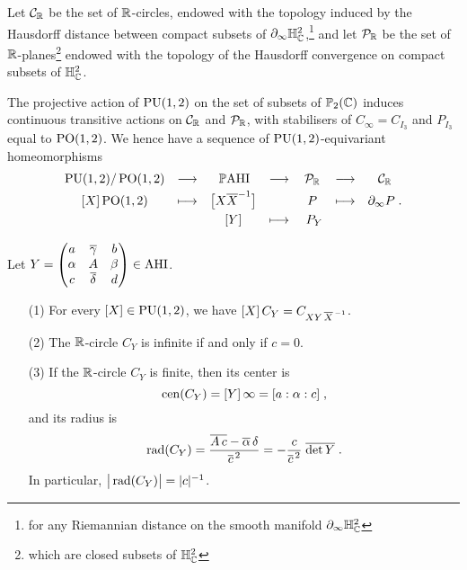 \documentclass[11pt]{article}
\begin{document}
\newcommand\rcircles{\C_\RR}
\newcommand\rplanes{\P_\RR}

\medskip
Let $\rcircles$ be the set of ${\mathbb R}$-circles, endowed with the topology
induced by the Hausdorff distance between compact subsets of
$\partial_\infty{\mathbb H}^2_{\mathbb C}$,\footnote{for any Riemannian distance on
  the smooth manifold $\partial_\infty{\mathbb H}^2_{\mathbb C}$} and let $\rplanes$
be the set of ${\mathbb R}$-planes\footnote{which are closed subsets of
  ${\mathbb H}^2_{\mathbb C}$} endowed with the topology of the Hausdorff convergence
on compact subsets of ${\mathbb H}^2_{\mathbb C}$.


The projective action of $\operatorname{PU}(1,2)$ on the set of subsets of
${\mathbb P}_2({\mathbb C})$ induces continuous transitive actions on $\rcircles$ and
$\rplanes$, with stabilisers of $C_\infty=C_{I_3}$ and $P_{I_3}$ equal
to $\operatorname{PO}(1,2)$.  We hence have a sequence of $\operatorname{PU}(1,2)$-equivariant
homeomorphisms
\begin{equation}\label{eq:homeospaceRcercle}
\begin{array}{ccccccc}
\vspace{.1cm} 
\PU(1,2)/\PO(1,2) & \longrightarrow & \phahi & \longrightarrow & 
\rplanes & \longrightarrow & \rcircles\\
\vspace{.1cm} 
{}[X]\PO(1,2) &\longmapsto & \big[X\ov{X}^{-1}\big]& & P &\longmapsto &
\partial_\infty P \;.\\ & & [Y]&\longmapsto & \ P_Y & &
\end{array}
\end{equation}


\blemm \label{lem:calccentrerayon}
Let $Y=\begin{pmatrix} a & {\overline{\gamma}} & b\\ \alpha & A & \beta \\ 
c & {\overline{\delta}} & d \end{pmatrix} \in\operatorname{AHI}$.
\begin{enumerate}
\item[(1)] For every $[X]\in\operatorname{PU}(1,2)$, we have
$[X]\,C_Y= C_{XY\,{\overline{X}}^{\,-1}}$.
\item[(2)]  The ${\mathbb R}$-circle $C_Y$ is infinite if and only if $c=0$.
\item[(3)] If the ${\mathbb R}$-circle $C_Y$ is finite, then its center is 
$$
\operatorname{cen}(C_Y)=[Y]\,\infty=[a:\alpha:c]\;,
$$
and its radius is
$$
\operatorname{rad}(C_Y)=  \frac{{\overline{A\,c}}-{\overline{\alpha}}\,\delta}{{\overline{c}}^{\,2}} =
-\frac{c}{{\overline{c}}^{\,2}} \;\overline{\det Y}
\;.
$$
In particular, $\big|\operatorname{rad}(C_Y)\big|= |c|^{-1}$. 
\end{enumerate}
\elemm
\end{document}
